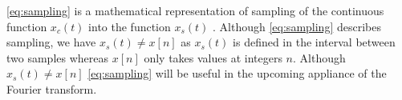 \eqref{eq:sampling} is a mathematical representation of sampling of the continuous function $x_c(t)$ into the function $x_s(t)$ \cite{DTSP}. Although \eqref{eq:sampling} describes sampling, we have $x_s(t)\neq x[n]$ as $x_s(t)$ is defined in the interval between two samples whereas $x[n]$ only takes values at integers $n$. Although $x_s(t)\neq x[n]$ \eqref{eq:sampling} will be useful in the upcoming appliance of the Fourier transform.
